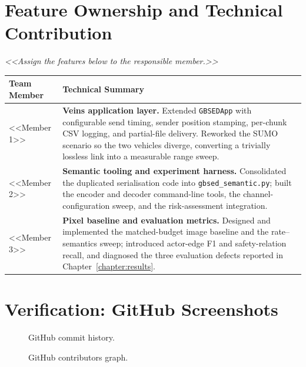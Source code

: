 \documentclass{iutbscthesis}
\begin{document}
\begin{appendices}
\section{Feature Ownership and Technical Contribution}

\textit{<<Assign the features below to the responsible member.>>}

\begin{center}
\begin{tabular}{|>{\centering\arraybackslash}m{2.6cm}|p{11.5cm}|}
    \hline
    \textbf{Team Member} & \textbf{Technical Summary} \\
    \hline
    <<Member 1>> & \textbf{Veins application layer.} Extended \texttt{GBSEDApp} with configurable send timing, sender position stamping, per-chunk CSV logging, and partial-file delivery. Reworked the SUMO scenario so the two vehicles diverge, converting a trivially lossless link into a measurable range sweep. \\
    \hline
    <<Member 2>> & \textbf{Semantic tooling and experiment harness.} Consolidated the duplicated serialisation code into \texttt{gbsed\_semantic.py}; built the encoder and decoder command-line tools, the channel-configuration sweep, and the risk-assessment integration. \\
    \hline
    <<Member 3>> & \textbf{Pixel baseline and evaluation metrics.} Designed and implemented the matched-budget image baseline and the rate--semantics sweep; introduced actor-edge F1 and safety-relation recall, and diagnosed the three evaluation defects reported in Chapter~\ref{chapter:results}. \\
    \hline
\end{tabular}
\end{center}

\section{Verification: GitHub Screenshots}

\begin{figure}[h]
    \centering
    \caption{GitHub commit history.}
    \label{fig:commits}
\end{figure}

\begin{figure}[h]
    \centering
    \caption{GitHub contributors graph.}
    \label{fig:graph}
\end{figure}

\end{appendices}
\end{document}
